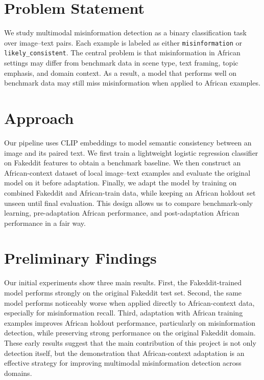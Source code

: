 \documentclass{article}
\begin{document}
\section{Problem Statement}
We study multimodal misinformation detection as a binary classification task over image--text pairs. Each example is labeled as either \texttt{misinformation} or \texttt{likely\_consistent}. The central problem is that misinformation in African settings may differ from benchmark data in scene type, text framing, topic emphasis, and domain context. As a result, a model that performs well on benchmark data may still miss misinformation when applied to African examples.

\section{Approach}
Our pipeline uses CLIP embeddings to model semantic consistency between an image and its paired text. We first train a lightweight logistic regression classifier on Fakeddit features to obtain a benchmark baseline. We then construct an African-context dataset of local image--text examples and evaluate the original model on it before adaptation. Finally, we adapt the model by training on combined Fakeddit and African-train data, while keeping an African holdout set unseen until final evaluation. This design allows us to compare benchmark-only learning, pre-adaptation African performance, and post-adaptation African performance in a fair way.

\section{Preliminary Findings}
Our initial experiments show three main results. First, the Fakeddit-trained model performs strongly on the original Fakeddit test set. Second, the same model performs noticeably worse when applied directly to African-context data, especially for misinformation recall. Third, adaptation with African training examples improves African holdout performance, particularly on misinformation detection, while preserving strong performance on the original Fakeddit domain. These early results suggest that the main contribution of this project is not only detection itself, but the demonstration that African-context adaptation is an effective strategy for improving multimodal misinformation detection across domains.
\end{document}
